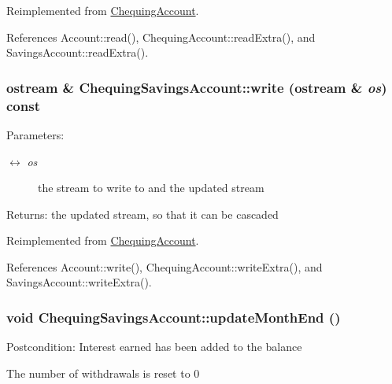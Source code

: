 Reimplemented from \hyperlink{classChequingAccount_b0aaf92f019e79f95c39a0f6996acbf5}{ChequingAccount}.

References Account::read(), ChequingAccount::readExtra(), and SavingsAccount::readExtra().\hypertarget{classChequingSavingsAccount_61888979bbaf273b2c20f92d2f41f226}{
\subsubsection[write]{\setlength{\rightskip}{0pt plus 5cm}ostream \& ChequingSavingsAccount::write (ostream \& {\em os}) const}}
\label{classChequingSavingsAccount_61888979bbaf273b2c20f92d2f41f226}


\begin{Desc}
\item[Parameters:]
\begin{description}
\item[\mbox{$\leftrightarrow$} {\em os}]the stream to write to and the updated stream \end{description}
\end{Desc}
\begin{Desc}
\item[Returns:]the updated stream, so that it can be cascaded \end{Desc}


Reimplemented from \hyperlink{classChequingAccount_b85b405548099388a5d7866ed9065d33}{ChequingAccount}.

References Account::write(), ChequingAccount::writeExtra(), and SavingsAccount::writeExtra().\hypertarget{classChequingSavingsAccount_0bbd0c3b03b968fc2f80eb2a4fffa3f2}{
\subsubsection[updateMonthEnd]{\setlength{\rightskip}{0pt plus 5cm}void ChequingSavingsAccount::updateMonthEnd ()}}
\label{classChequingSavingsAccount_0bbd0c3b03b968fc2f80eb2a4fffa3f2}


\begin{Desc}
\item[Postcondition:]Interest earned has been added to the balance 

The number of withdrawals is reset to 0 \end{Desc}



